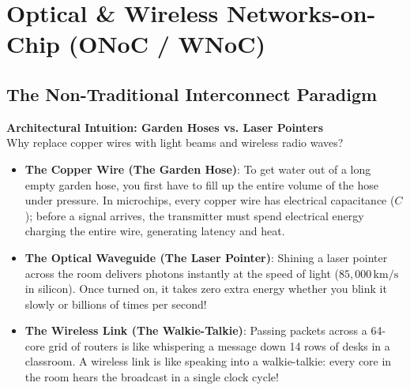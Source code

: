 
\chapter{Optical \& Wireless Networks-on-Chip (ONoC / WNoC)}
\label{chap:optical-wireless}


\section{The Non-Traditional Interconnect Paradigm}
\label{sec:optical-wireless-intro}

\begin{svgraybox}
\textbf{Architectural Intuition: Garden Hoses vs. Laser Pointers} \\
Why replace copper wires with light beams and wireless radio waves?
\begin{itemize}
    \item \textbf{The Copper Wire (The Garden Hose)}: To get water out of a long empty garden hose, you first have to fill up the entire volume of the hose under pressure. In microchips, every copper wire has electrical capacitance ($C$); before a signal arrives, the transmitter must spend electrical energy charging the entire wire, generating latency and heat.
    \item \textbf{The Optical Waveguide (The Laser Pointer)}: Shining a laser pointer across the room delivers photons instantly at the speed of light ($85{,}000\,\mathrm{km/s}$ in silicon). Once turned on, it takes zero extra energy whether you blink it slowly or billions of times per second!
    \item \textbf{The Wireless Link (The Walkie-Talkie)}: Passing packets across a 64-core grid of routers is like whispering a message down 14 rows of desks in a classroom. A wireless link is like speaking into a walkie-talkie: every core in the room hears the broadcast in a single clock cycle!
\end{itemize}
\end{svgraybox}

